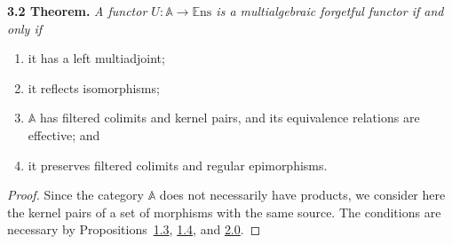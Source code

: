 \documentclass{article}
\newenvironment{itenv}[1]
  {\phantomsection\par\medskip\noindent\textbf{#1.}\itshape}
  {\medskip}
\newcommand{\bb}[1]{{\mathbb{#1}}}
\newcommand{\Set}{\mathbb{E}\mathrm{ns}}
\begin{document}
\begin{itenv}{3.2 Theorem}
\label{3.2}
  A functor $U\colon\bb{A}\to\Set$ is a multialgebraic forgetful functor if and only if
  \begin{enumerate}[1)]
    \item it has a left multiadjoint;
    \item it reflects isomorphisms;
    \item $\bb{A}$ has filtered colimits and kernel pairs, and its equivalence relations are effective; and
    \item it preserves filtered colimits and regular epimorphisms.
  \end{enumerate}
\end{itenv}

\begin{proof}
  Since the category $\bb{A}$ does not necessarily have products, we consider here the kernel pairs of a set of morphisms with the same source.
  The conditions are necessary by Propositions~\hyperref[1.3]{1.3}, \hyperref[1.4]{1.4}, and \hyperref[2.0]{2.0}.


\end{proof}
\end{document}
